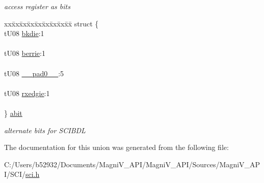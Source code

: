 \begin{DoxyCompactItemize}
\begin{tabbing}
\end{tabbing}\begin{DoxyCompactList}\small\item\em access register as bits \end{DoxyCompactList}\item 
\hypertarget{unionu_s_c_i_b_d_l_af9799b110ffa699efdf371273a04a1e6}{}\begin{tabbing}
xx\=xx\=xx\=xx\=xx\=xx\=xx\=xx\=xx\=\kill
struct \{\\
\>tU08 \hyperlink{unionu_s_c_i_b_d_l_af7469e7b4685fd2cd77199c7f3979e0d}{bkdie}:1\\
\>\\
\>tU08 \hyperlink{unionu_s_c_i_b_d_l_ac8ebf8179882be33a0d1930f15f56c1f}{berrie}:1\\
\>\\
\>tU08 \hyperlink{unionu_s_c_i_b_d_l_aa3e5250d311ceb1525f9adf38f0d7982}{\_\_pad0\_\_}:5\\
\>\\
\>tU08 \hyperlink{unionu_s_c_i_b_d_l_a20d8c1b31b0ed77302032e26b618eea6}{rxedgie}:1\\
\>\\
\} \hyperlink{unionu_s_c_i_b_d_l_af9799b110ffa699efdf371273a04a1e6}{abit}\label{unionu_s_c_i_b_d_l_af9799b110ffa699efdf371273a04a1e6}
\\

\end{tabbing}\begin{DoxyCompactList}\small\item\em alternate bits for S\+C\+I\+B\+D\+L \end{DoxyCompactList}\end{DoxyCompactItemize}


The documentation for this union was generated from the following file\+:\begin{DoxyCompactItemize}
\item 
C\+:/\+Users/b52932/\+Documents/\+Magni\+V\+\_\+\+A\+P\+I/\+Magni\+V\+\_\+\+A\+P\+I/\+Sources/\+Magni\+V\+\_\+\+A\+P\+I/\+S\+C\+I/\hyperlink{sci_8h}{sci.\+h}\end{DoxyCompactItemize}

